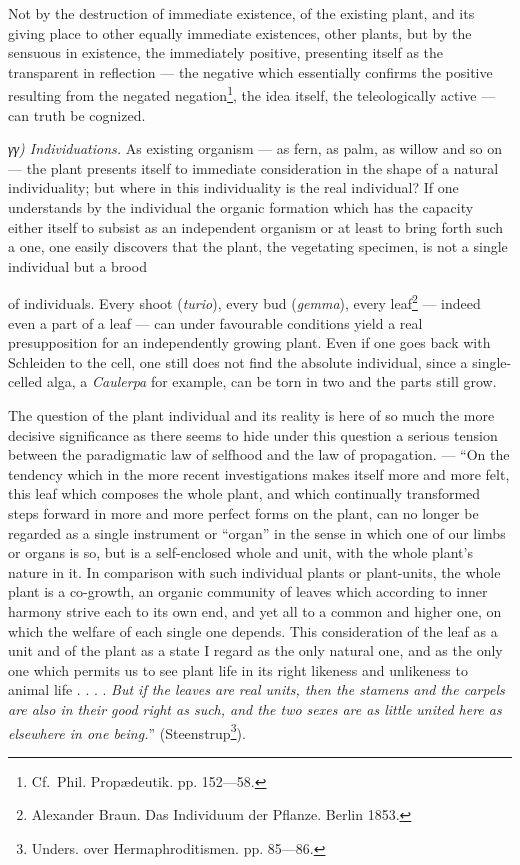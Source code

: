 \documentclass[12pt,a4paper]{book}
\begin{document}
Not by the destruction of immediate existence, of the existing plant, and its
giving place to other equally immediate existences, other plants, but by the
sensuous in existence, the immediately positive, presenting itself as the
transparent in reflection --- the negative which essentially confirms the positive
resulting from the negated negation\footnote{Cf.\ Phil. Propædeutik.
pp. 152---58.}, the idea itself, the teleologically active --- can truth be
cognized.

\emph{γγ) Individuations.} As existing organism --- as fern, as palm, as willow
and so on --- the plant presents itself to immediate consideration in the shape of
a natural individuality; but where in this individuality is the real individual?
If one understands by the individual the organic formation which has the capacity
either itself to subsist as an independent organism or at least to bring forth
such a one, one easily discovers that the plant, the vegetating specimen, is not a
single individual but a brood

\setcounter{footnote}{0}
of individuals. Every shoot (\textit{turio}), every bud (\textit{gemma}), every
leaf\footnote{Alexander Braun. Das Individuum der Pflanze. Berlin 1853.} --- indeed
even a part of a leaf --- can under favourable conditions yield a real
presupposition for an independently growing plant. Even if one goes back with
Schleiden to the cell, one still does not find the absolute individual, since a
single-celled alga, a \textit{Caulerpa} for example, can be torn in two and the
parts still grow.

The question of the plant individual and its reality is here of so much the more
decisive significance as there seems to hide under this question a serious tension
between the paradigmatic law of selfhood and the law of propagation. --- ``On the
tendency which in the more recent investigations makes itself more and more felt,
this leaf which composes the whole plant, and which continually transformed steps
forward in more and more perfect forms on the plant, can no longer be regarded as a
single instrument or ``organ'' in the sense in which one of our limbs or organs is
so, but is a self-enclosed whole and unit, with the whole plant's nature in it. In
comparison with such individual plants or plant-units, the whole plant is a
co-growth, an organic community of leaves which according to inner harmony strive
each to its own end, and yet all to a common and higher one, on which the welfare
of each single one depends. This consideration of the leaf as a unit and of the
plant as a state I regard as the only natural one, and as the only one which
permits us to see plant life in its right likeness and unlikeness to animal life
. . . .
\emph{But if the leaves are real units, then the stamens and the carpels are also
in their good right as such, and the two sexes are as little united here as
elsewhere in one being.}'' (Steenstrup\footnote{Unders. over Hermaphroditismen.
pp. 85---86.}).
\end{document}
